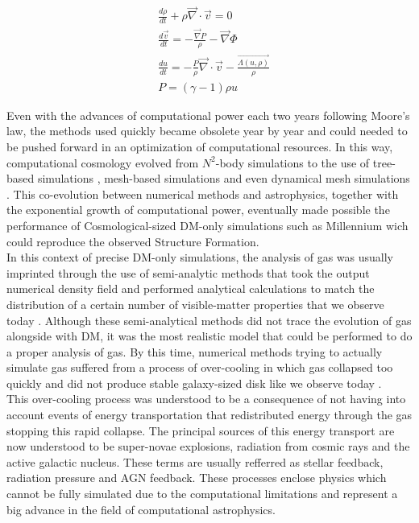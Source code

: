 \begin{align}
&\frac{d\rho}{dt} + \rho \vec{\nabla}\cdot\vec{v} = 0\\
&\frac{d\vec{v}}{dt} = -\frac{\vec{\nabla}P}{\rho} - \vec{\nabla} \Phi \\
&\frac{du}{dt} = -\frac{P}{\rho}\vec{\nabla}\cdot\vec{v} - \frac{\vec{\Lambda(u,\rho)}}{\rho}\\
& P = (\gamma -1 )\rho u
\label{eq:euler}
\end{align}


Even with the advances of computational power each two years following Moore's law, the methods used quickly became obsolete year by year and could needed to be pushed forward in an optimization of computational resources. In this way, computational cosmology evolved from $N^2$-body simulations to the use of tree-based simulations \cite{}, mesh-based simulations \cite{} and even dynamical mesh simulations \cite{}. This co-evolution between numerical methods and astrophysics, together with the exponential growth of computational power, eventually made possible the performance of Cosmological-sized DM-only simulations such as Millennium wich could reproduce the observed Structure Formation. \\ 

In this context of precise DM-only simulations, the analysis of gas was usually imprinted through the use of semi-analytic methods that took the output numerical density field and performed analytical calculations to match the distribution of a certain number of visible-matter properties that we observe today \cite{Analytical methods}. Although these semi-analytical methods did not trace the evolution of gas alongside with DM, it was the most realistic model that could be performed to do a proper analysis of gas. By this time, numerical methods trying to actually simulate gas suffered from a process of over-cooling in which gas collapsed too quickly and did not produce stable galaxy-sized disk like we observe today \cite{cooling}.\\

This over-cooling process was understood to be a consequence of not having into account events of energy transportation that redistributed energy through the gas stopping this rapid collapse. The principal sources of this energy transport are now understood to be super-novae explosions, radiation from cosmic rays and the active galactic nucleus. These terms are usually refferred as stellar feedback, radiation pressure and AGN feedback. These processes enclose physics which cannot be fully simulated due to the computational limitations and represent a big advance in the field of computational astrophysics.\\

